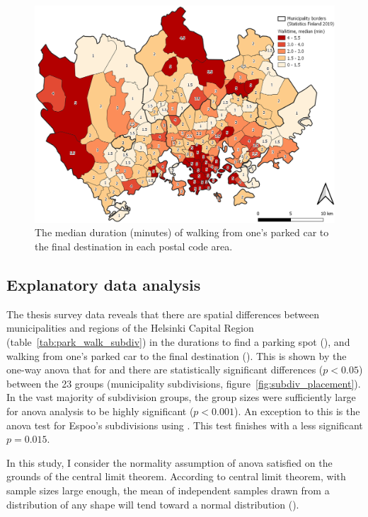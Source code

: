 \begin{figure}
    \centering
    \includegraphics[width=\textwidth]{images/thesis_postalvis_walkmedian.png}
    \caption[Walktime, median, in the study area]{The median duration (minutes) of walking from one's parked car to the final destination in each postal code area.}%
    \label{fig:postalvis_walkmedian}%
\end{figure}
\restoregeometry

\subsection{Explanatory data analysis}
\justify

The thesis survey data reveals that there are spatial differences between municipalities and regions of the Helsinki Capital Region (table~\ref{tab:park_walk_subdiv}) in the durations to find a parking spot (), and walking from one's parked car to the final destination (). This is shown by the one-way \acrfull{anova} that for  and  there are statistically significant differences ($p < 0.05$) between the 23 groups (municipality subdivisions, figure~\ref{fig:subdiv_placement}). In the vast majority of subdivision groups, the group sizes were sufficiently large for \acrshort{anova} analysis to be highly significant ($p < 0.001$). An exception to this is the \acrshort{anova} test for Espoo's subdivisions using . This test finishes with a less significant $p = 0.015$.

In this study, I consider the normality assumption of \acrshort{anova} satisfied on the grounds of the central limit theorem. According to central limit theorem, with sample sizes large enough, the mean of independent samples drawn from a distribution of any shape will tend toward a normal distribution (\cite{Kwak2017}).

